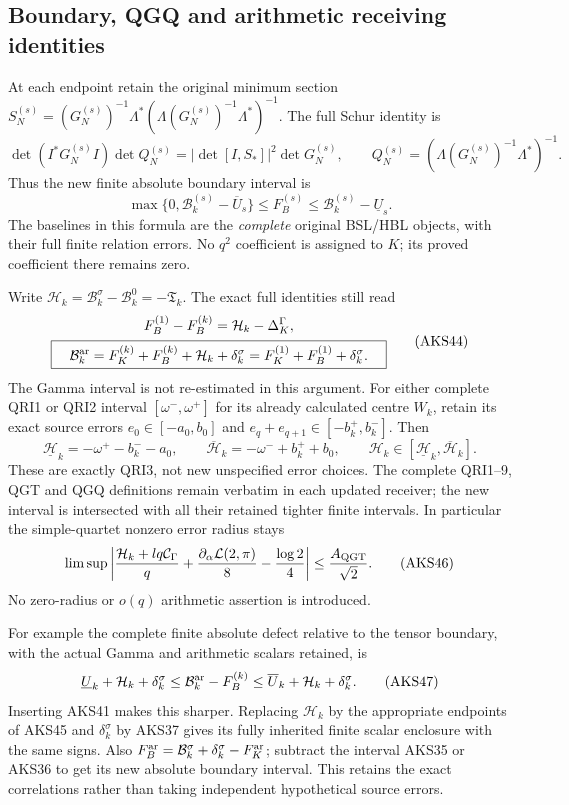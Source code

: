 \subsection{Boundary, QGQ and arithmetic receiving identities}
At each endpoint retain the original minimum section
$S_N^{(s)}=(G_N^{(s)})^{-1}\Lambda^*
(\Lambda(G_N^{(s)})^{-1}\Lambda^*)^{-1}$. The full Schur identity is
\[
 \det(I^*G_N^{(s)}I)\det Q_N^{(s)}
       =|\det[I,S_*]|^2\det G_N^{(s)},\qquad
 Q_N^{(s)}=(\Lambda(G_N^{(s)})^{-1}\Lambda^*)^{-1}.
 \tag{AKS42}
\]
Thus the new finite absolute boundary interval is
\[
 \max\{0,\mathcal B_k^{(s)}-\overline U_s\}
       \le F_B^{(s)}\le\mathcal B_k^{(s)}-\underline U_s.
 \tag{AKS43}
\]
The baselines in this formula are the \emph{complete} original BSL/HBL
objects, with their full finite relation errors. No $q^2$ coefficient is
assigned to $K$; its proved coefficient there remains zero.

Write $\mathcal H_k=\mathcal B_k^\sigma-\mathcal B_k^0=-\mathfrak T_k$.
The exact full identities still read
\[
\begin{gathered}
 F_B^{(1)}-F_B^{(k)}=\mathcal H_k-\Delta_K^\Gamma,\\
 \boxed{\quad\mathcal B_k^{\rm ar}
   =F_K^{(k)}+F_B^{(k)}+\mathcal H_k+\delta_k^\sigma
   =F_K^{(1)}+F_B^{(1)}+\delta_k^\sigma.\quad}
\end{gathered}\tag{AKS44}
\]
The Gamma interval is not re-estimated in this argument. For either
complete QRI1 or QRI2 interval $[\omega^-,\omega^+]$ for its already
calculated centre $W_k$, retain its exact source errors
$e_0\in[-a_0,b_0]$ and $e_q+e_{q+1}\in[-b_k^+,b_k^-]$. Then
\[
 \underline{\mathcal H}_k=-\omega^+-b_k^--a_0,
 \qquad\overline{\mathcal H}_k=-\omega^-+b_k^++b_0,
 \qquad \mathcal H_k\in
       [\underline{\mathcal H}_k,\overline{\mathcal H}_k].
 \tag{AKS45}
\]
These are exactly QRI3, not new unspecified error choices. The complete
QRI1--9, QGT and QGQ definitions remain verbatim in each updated receiver;
the new interval is intersected with all their retained tighter finite
intervals. In particular the simple-quartet nonzero error radius stays
\[
 \limsup\left|
 \frac{\mathcal H_k+lq\mathcal C_\Gamma}{q}
       +\frac{\partial_\alpha\mathcal L(2,\pi)}8
       -\frac{\log2}{4}\right|\le\frac{A_{\rm QGT}}{\sqrt2}.
 \tag{AKS46}
\]
No zero-radius or $o(q)$ arithmetic assertion is introduced.

For example the complete finite absolute defect relative to the tensor
boundary, with the actual Gamma and arithmetic scalars retained, is
\[
 \underline U_k+\mathcal H_k+\delta_k^\sigma
 \le\mathcal B_k^{\rm ar}-F_B^{(k)}
 \le\overline U_k+\mathcal H_k+\delta_k^\sigma.
 \tag{AKS47}
\]
Inserting AKS41 makes this sharper. Replacing $\mathcal H_k$ by the
appropriate endpoints of AKS45 and $\delta_k^\sigma$ by AKS37 gives its
fully inherited finite scalar enclosure with the same signs.
Also $F_B^{\rm ar}=\mathcal B_k^\sigma+\delta_k^\sigma-F_K^{\rm ar}$;
subtract the interval AKS35 or AKS36 to get its new absolute boundary
interval. This retains the exact correlations rather than taking
independent hypothetical source errors.

